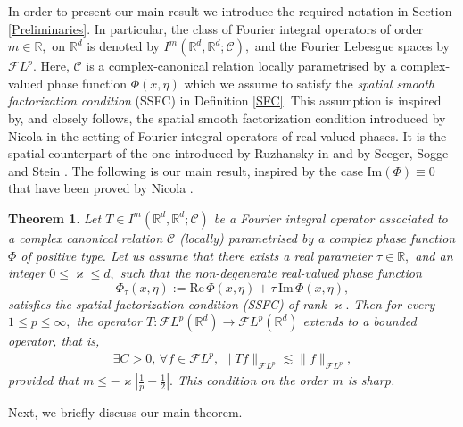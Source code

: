 \documentclass[12pt, reqno]{amsart}
\renewcommand{\Im}{\mathrm{Im}\,}
\renewcommand{\Re}{\mathrm{Re}\,}
\newtheorem{theorem}{Theorem}[section]
\theoremstyle{definition}
\theoremstyle{remark}
\numberwithin{equation}{section}
\begin{document}
In order to present our main result we introduce the required notation in Section \ref{Preliminaries}. In particular,  the class of Fourier integral operators of order $m\in \mathbb{R},$ on $\mathbb{R}^d$  is denoted by $I^m(\mathbb{R}^d,\mathbb{R}^d;\mathcal{C}),$ and the Fourier Lebesgue spaces by  $\mathcal{F}L^p.$  Here, $\mathcal{C}$ is a complex-canonical relation locally parametrised by a complex-valued phase function $\Phi(x,\eta)$ which we assume to satisfy the {\it spatial smooth factorization condition} (SSFC) in Definition \ref{SFC}. This assumption
is inspired by, and closely follows, the spatial smooth factorization
condition introduced by Nicola \cite{Nicola2010} in the setting of Fourier integral operators of real-valued phases. It is the spatial counterpart of the one introduced by Ruzhansky in  \cite{Ruz2001} and by Seeger, Sogge and Stein \cite{SSS}. 
The following is our main result, inspired by  the case $\text{Im}(\Phi)\equiv 0$ that have been proved by Nicola \cite{Nicola2010}.
\begin{theorem}\label{Main:theorem}
Let $T\in I^m(\mathbb{R}^d,\mathbb{R}^d;\mathcal{C})$ be a Fourier integral operator associated to a complex canonical relation $\mathcal{C}$ (locally) parametrised by a complex phase function $\Phi$ of positive type.  
Let us assume that there exists a real parameter $\tau\in\mathbb{R},$ and an integer
$0\le \varkappa\le d,$ such that the non-degenerate real-valued phase function
\[
\Phi_\tau(x,\eta):=\Re\Phi(x,\eta)+\tau\,\Im\Phi(x,\eta),
\]
satisfies the spatial factorization condition (SSFC) of rank $\varkappa.$ Then for every $1\le p\le\infty,$ the operator $T:\mathcal{F}L^p(\mathbb{R}^d)\longrightarrow \mathcal{F}L^p(\mathbb{R}^d)$ extends to a bounded operator, that is, 
\begin{align*}
\exists C>0,\,\forall f\in  \mathcal{F}L^p,\,
\|Tf\|_{\mathcal{F}L^p}\lesssim \|f\|_{\mathcal{F}L^p},
\end{align*}provided that $ 
m \leq -\varkappa\left|\frac{1}{p}-\frac{1}{2}\right|.$ This condition on the order $m$ is sharp. 
\end{theorem}
Next, we briefly discuss our main theorem.
\end{document}
